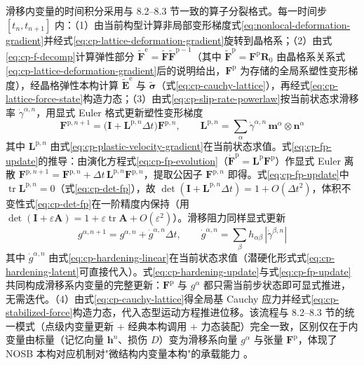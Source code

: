滑移内变量的时间积分采用与 8.2--8.3 节一致的算子分裂格式。每一时间步 $[t_{n},t_{n+1}]$ 内：（1）由当前构型计算非局部变形梯度式\eqref{eq:nonlocal-deformation-gradient}并经式\eqref{eq:cp-lattice-deformation-gradient}旋转到晶格系；（2）由式\eqref{eq:cp-f-decomp}计算弹性部分 $\tilde{\mathbf{F}}^{\mathrm{e}}=\tilde{\mathbf{F}}\tilde{\mathbf{F}}^{\mathrm{p}-1}$（其中 $\tilde{\mathbf{F}}^{\mathrm{p}}=\mathbf{F}^{\mathrm{p}}\mathbf{R}_{0}$ 由晶格系关系式\eqref{eq:cp-lattice-deformation-gradient}后的说明给出，$\mathbf{F}^{\mathrm{p}}$ 为存储的全局系塑性变形梯度），经晶格弹性本构计算 $\tilde{\mathbf{E}}^{\mathrm{e}}$ 与 $\tilde{\boldsymbol{\sigma}}$（式\eqref{eq:cp-cauchy-lattice}），再经式\eqref{eq:cp-lattice-force-state}构造力态；（3）由式\eqref{eq:cp-slip-rate-powerlaw}按当前状态求滑移率 $\dot{\gamma}^{\alpha,n}$，用显式 Euler 格式更新塑性变形梯度
\begin{equation}
  \mathbf{F}^{\mathrm{p},n+1}
  =\bigl(\mathbf{I}+\mathbf{L}^{\mathrm{p},n}\Delta t\bigr)\mathbf{F}^{\mathrm{p},n},
  \qquad
  \mathbf{L}^{\mathrm{p},n}=\sum_{\alpha}\dot{\gamma}^{\alpha,n}\,\mathbf{m}^{\alpha}\otimes\mathbf{n}^{\alpha}
  \label{eq:cp-fp-update}
\end{equation}
其中 $\mathbf{L}^{\mathrm{p},n}$ 由式\eqref{eq:cp-plastic-velocity-gradient}在当前状态求值。式\eqref{eq:cp-fp-update}的推导：由演化方程式\eqref{eq:cp-fp-evolution}（$\dot{\mathbf{F}}^{\mathrm{p}}=\mathbf{L}^{\mathrm{p}}\mathbf{F}^{\mathrm{p}}$）作显式 Euler 离散 $\mathbf{F}^{\mathrm{p},n+1}=\mathbf{F}^{\mathrm{p},n}+\Delta t\,\mathbf{L}^{\mathrm{p},n}\mathbf{F}^{\mathrm{p},n}$，提取公因子 $\mathbf{F}^{\mathrm{p},n}$ 即得。式\eqref{eq:cp-fp-update}中 $\operatorname{tr}\mathbf{L}^{\mathrm{p},n}=0$（式\eqref{eq:cp-det-fp}），故 $\det(\mathbf{I}+\mathbf{L}^{\mathrm{p},n}\Delta t)=1+O(\Delta t^{2})$，体积不变性式\eqref{eq:cp-det-fp}在一阶精度内保持（用 $\det(\mathbf{I}+\varepsilon\mathbf{A})=1+\varepsilon\operatorname{tr}\mathbf{A}+O(\varepsilon^{2})$）。滑移阻力同样显式更新
\begin{equation}
  g^{\alpha,n+1}=g^{\alpha,n}+\dot{g}^{\alpha,n}\Delta t,
  \qquad
  \dot{g}^{\alpha,n}=\sum_{\beta}h_{\alpha\beta}\,|\dot{\gamma}^{\beta,n}|
  \label{eq:cp-hardening-update}
\end{equation}
其中 $\dot{g}^{\alpha,n}$ 由式\eqref{eq:cp-hardening-linear}在当前状态求值（潜硬化形式式\eqref{eq:cp-hardening-latent}可直接代入）。式\eqref{eq:cp-hardening-update}与式\eqref{eq:cp-fp-update}共同构成滑移系内变量的完整更新：$\mathbf{F}^{\mathrm{p}}$ 与 $g^{\alpha}$ 都只需当前步状态即可显式推进，无需迭代。（4）由式\eqref{eq:cp-cauchy-lattice}得全局基 Cauchy 应力并经式\eqref{eq:cp-stabilized-force}构造力态，代入态型运动方程推进位移。该流程与 8.2--8.3 节的统一模式（点级内变量更新 + 经典本构调用 + 力态装配）完全一致，区别仅在于内变量由标量（记忆向量 $\mathbf{h}^{n}$、损伤 $D$）变为滑移系向量 $g^{\alpha}$ 与张量 $\mathbf{F}^{\mathrm{p}}$，体现了 NOSB 本构对应机制对"微结构内变量本构"的承载能力 \cite{SunSundararaghavan2014,GuZhangMadenci2019}。

